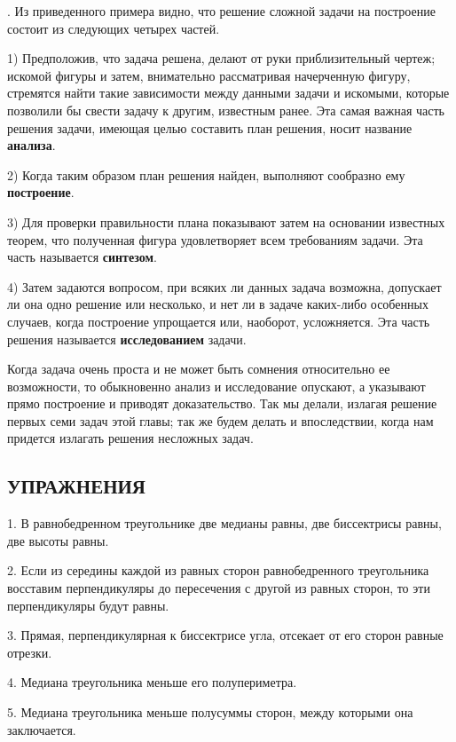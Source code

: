\documentclass[oneside]{book}
\begin{document}
.
Из приведенного примера видно, что решение сложной задачи на построение состоит из следующих четырех частей.

1) Предположив, что задача решена, делают от руки приблизительный чертеж;
искомой фигуры и затем, внимательно рассматривая начерченную фигуру, стремятся найти такие зависимости между данными задачи и искомыми, которые позволили бы свести задачу к другим, известным ранее.
Эта самая важная часть решения задачи, имеющая целью составить план решения, носит название \textbf{анализа}.

2) Когда таким образом план решения найден, выполняют сообразно ему \textbf{построение}.

3) Для проверки правильности плана показывают затем на основании известных теорем, что полученная фигура удовлетворяет всем требованиям задачи.
Эта часть называется \textbf{синтезом}.

4) Затем задаются вопросом, при всяких ли данных задача возможна, допускает ли она одно решение или несколько, и нет ли в задаче каких-либо особенных случаев, когда построение упрощается или, наоборот, усложняется.
Эта часть решения называется \textbf{исследованием} задачи.

Когда задача очень проста и не может быть сомнения относительно ее возможности, то обыкновенно анализ и исследование опускают, а указывают прямо построение и приводят доказательство.
Так мы делали, излагая решение первых семи задач этой главы;
так же будем делать и впоследствии, когда нам придется излагать решения несложных задач.

\subsection*{УПРАЖНЕНИЯ}


1.
В равнобедренном треугольнике две медианы равны, две биссектрисы равны, две высоты равны.

2.
Если из середины каждой из равных сторон равнобедренного треугольника восставим перпендикуляры до пересечения с другой из равных сторон, то эти перпендикуляры будут равны.

3.
Прямая, перпендикулярная к биссектрисе угла, отсекает от его сторон равные отрезки.

4.
Медиана треугольника меньше его полупериметра.

5.
Медиана треугольника меньше полусуммы сторон, между которыми она заключается.
\end{document}
